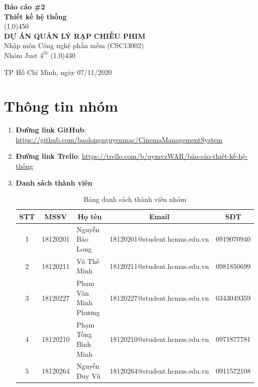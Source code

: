 \documentclass[a4paper, 12pt]{article}
\begin{document}
\begin{titlepage}
	\begin{center}
		\vspace*{1cm}
		\Large\textbf{Báo cáo \#2\\Thiết kế hệ thống}\\
		
		\vfill
		\line(1,0){450}\\[4mm]
		\LARGE\textbf{\MakeUppercase{Dự án quản lý rạp chiếu phim}}\\[3mm]
		\Large{Nhập môn Công nghệ phần mềm (CSC13002)}\\[3mm]
		\Large{Nhóm Just $4^{th}$}
		\line(1,0){430}\\
		\vfill
		
		\vfill
		TP Hồ Chí Minh, ngày 07/11/2020
	\end{center}
\end{titlepage}

\tableofcontents
\thispagestyle{empty}
\clearpage

\section{Thông tin nhóm}
\label{sec:info}
\begin{enumerate}
	\item \textbf{Đường link GitHub}: \url{https://github.com/baolongnguyenmac/CinemaManagementSystem}
	\item \textbf{Đường link Trello}: \url{https://trello.com/b/uymvzWAR/báo-cáo-thiết-kế-hệ-thống}
	\item \textbf{Danh sách thành viên}
	\begin{table}[H]
		\begin{center}
			\begin{tabular}{|c|c|l|c|c|}
				\hline
				STT & MSSV     & \multicolumn{1}{c|}{Họ tên} & Email                         & SĐT        \\ \hline
				1   & 18120201 & Nguyễn Bảo Long             & 18120201@student.hcmus.edu.vn & 0919070940 \\ \hline
				2   & 18120211 & Võ Thế Minh                 & 18120211@student.hcmus.edu.vn & 0981850699 \\ \hline
				3   & 18120227 & Phạm Văn Minh Phương        & 18120227@student.hcmus.edu.vn & 0343049359 \\ \hline
				4   & 18120210 & Phạm Tống Bình Minh         & 18120210@student.hcmus.edu.vn & 0971877781 \\ \hline
				5   & 18120264 & Nguyễn Duy Vũ               & 18120264@student.hcmus.edu.vn & 0911572108 \\ \hline
			\end{tabular}
			\caption{Bảng danh sách thành viên nhóm}
		\end{center}
	\end{table}
\end{enumerate}
\clearpage
\end{document}
